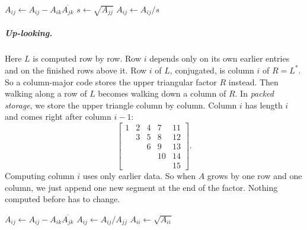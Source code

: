\begin{algorithm}[H]
  \caption{Cholesky factorization, left-looking, in place (lower triangle).}
  \label{alg:chol-left}
  \begin{algorithmic}[1]
          \State $A_{ij} \gets A_{ij} - A_{ik}\overline{A_{jk}}$
        \EndFor
      \EndFor
      \State $s \gets \sqrt{A_{jj}}$ 
        \State $A_{ij} \gets A_{ij} / s$
      \EndFor
    \EndFor
  \end{algorithmic}
\end{algorithm}

\subparagraph{Up-looking.} Here $L$ is computed row by row. Row $i$ depends only on its own earlier entries and on the finished rows above it. Row $i$ of $L$, conjugated, is column $i$ of $R = L^\ast$. So a column-major code stores the upper triangular factor $R$ instead. Then walking along a row of $L$ becomes walking down a column of $R$. In \emph{packed storage}, we store the upper triangle column by column. Column $i$ has length $i$ and comes right after column $i - 1$:
\begin{equation}
  \begin{bmatrix} 1 & 2 & 4 & 7 & 11 \\ & 3 & 5 & 8 & 12 \\ & & 6 & 9 & 13 \\ & & & 10 & 14 \\ & & & & 15 \end{bmatrix}.
\end{equation}
Computing column $i$ uses only earlier data. So when $A$ grows by one row and one column, we just append one new segment at the end of the factor. Nothing computed before has to change.

\begin{algorithm}[H]
  \caption{Cholesky factorization, up-looking, in place (lower triangle).}
  \label{alg:chol-up}
  \begin{algorithmic}[1]
          \State $A_{ij} \gets A_{ij} - A_{ik}\overline{A_{jk}}$
        \EndFor
          \State $A_{ij} \gets A_{ij} / A_{jj}$ 
        \Else
          \State $A_{ii} \gets \sqrt{A_{ii}}$
        \EndIf
      \EndFor
    \EndFor
  \end{algorithmic}
\end{algorithm}

